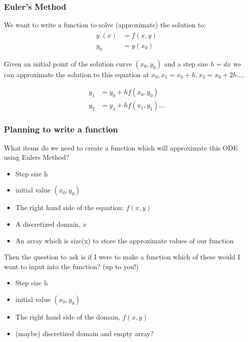 \documentclass{beamer}
\begin{document}
\begin{frame}
\frametitle{Euler's Method}
We want to write a function to solve (approximate) the solution to: \\

\begin{align*}
{y}^{\prime}(x) &= f(x,y)\\
y_0 &= y(x_0)
\end{align*}

Given an initial point of the solution curve $(x_0, y_0)$ and a step size $h=dx$ we can approximate the solution to this equation at $x_0, x_1 = x_0 + h, x_2 = x_0 + 2h ...$. 

\begin{align*}
y_1 &= y_0 + hf(x_0,y_0)\\
y_2 &= y_1 + hf(x_1,y_1)...
\end{align*}
\end{frame}
\begin{frame}
\frametitle{Planning to write a function} 

What items do we need to create a function which will approximate this ODE  using Eulers Method? 

\begin{itemize}
\item Step size h
\item initial value $(x_0,y_0)$
\item The right hand side of the equation: $f(x,y)$
\item A discretized domain, $x$
\item An array which is size(x) to store the approximate values of our function
\end{itemize}

Then the question to ask is if I were to make a function which of these would I want to input into the function? (up to you!)

\begin{itemize}
\item Step size h 
\item initial value $(x_0,y_0)$
\item The right hand side of the domain, $f(x,y)$
\item (maybe) discretized domain and empty array?
\end{itemize}

\end{frame}
\end{document}
